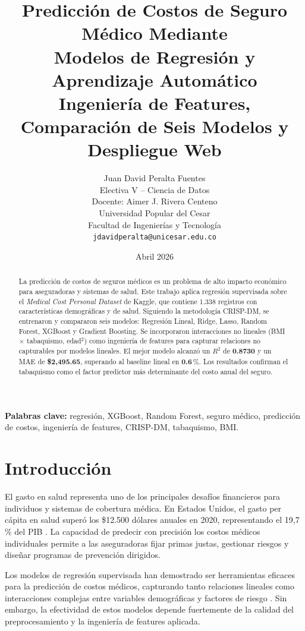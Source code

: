 \documentclass[12pt, a4paper]{article}
\title{\textbf{Predicción de Costos de Seguro Médico Mediante\\
Modelos de Regresión y Aprendizaje Automático}\\[6pt]
\large Ingeniería de Features, Comparación de Seis Modelos y Despliegue Web}
\author{Juan David Peralta Fuentes\\
\small Electiva V -- Ciencia de Datos\\
\small Docente: Aimer J. Rivera Centeno\\
\small Universidad Popular del Cesar\\
\small Facultad de Ingenierías y Tecnología\\
\small \texttt{jdavidperalta@unicesar.edu.co}}
\date{Abril 2026}
\begin{document}
\maketitle

\begin{abstract}
La predicción de costos de seguros médicos es un problema de alto impacto
económico para aseguradoras y sistemas de salud. Este trabajo aplica
regresión supervisada sobre el \textit{Medical Cost Personal Dataset}
de Kaggle, que contiene 1.338 registros con características demográficas
y de salud. Siguiendo la metodología CRISP-DM, se entrenaron y compararon
seis modelos: Regresión Lineal, Ridge, Lasso, Random Forest, XGBoost y
Gradient Boosting. Se incorporaron interacciones no lineales
(BMI $\times$ tabaquismo, edad$^2$) como ingeniería de features para
capturar relaciones no capturables por modelos lineales. El mejor modelo
alcanzó un $R^2$ de \textbf{0.8730} y un MAE de \textbf{\$2,495.65},
superando al baseline lineal en \textbf{0.6}\,\%. Los resultados
confirman el tabaquismo como el factor predictor más determinante del
costo anual del seguro.
\end{abstract}

\noindent\textbf{Palabras clave:} regresión, XGBoost, Random Forest,
seguro médico, predicción de costos, ingeniería de features, CRISP-DM,
tabaquismo, BMI.

\tableofcontents
\newpage

\section{Introducción}

El gasto en salud representa uno de los principales desafíos financieros
para individuos y sistemas de cobertura médica. En Estados Unidos, el gasto
per cápita en salud superó los \$12.500 dólares anuales en 2020,
representando el 19{,}7\,\% del PIB \cite{cms2022national}. La capacidad
de predecir con precisión los costos médicos individuales permite a las
aseguradoras fijar primas justas, gestionar riesgos y diseñar programas
de prevención dirigidos.

Los modelos de regresión supervisada han demostrado ser herramientas
eficaces para la predicción de costos médicos, capturando tanto relaciones
lineales como interacciones complejas entre variables demográficas y
factores de riesgo \cite{duan2021prediction}. Sin embargo, la efectividad
de estos modelos depende fuertemente de la calidad del preprocesamiento y
la ingeniería de features aplicada.
\end{document}
